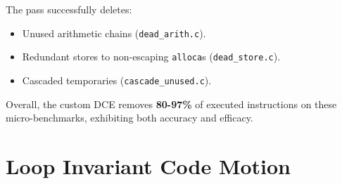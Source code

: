 \documentclass{article}
\begin{document}
\begin{itemize}
	      The pass successfully deletes:
	      \begin{itemize}\itemsep0.2ex
		      \item Unused arithmetic chains (\texttt{dead\_arith.c}).
		      \item Redundant stores to non-escaping \texttt{alloca}s
		            (\texttt{dead\_store.c}).
		      \item Cascaded temporaries (\texttt{cascade\_unused.c}).
	      \end{itemize}

	      Overall, the custom DCE removes \textbf{80-97\%} of executed instructions on
	      these micro-benchmarks, exhibiting both accuracy and efficacy.


\end{itemize}


\section{Loop Invariant Code Motion}
\end{document}
